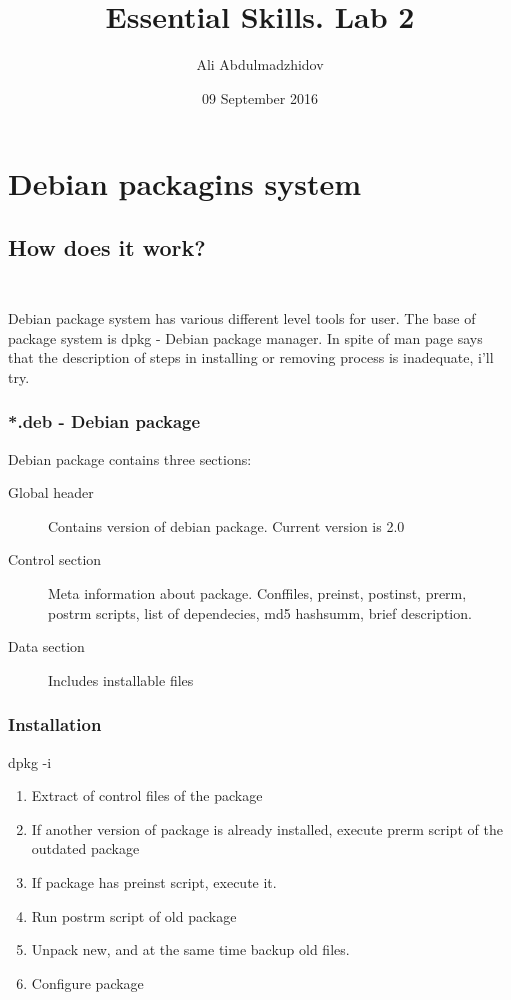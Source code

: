\documentclass[10pt]{article}
\title{Essential Skills. Lab 2}
\date{09 September 2016}
\author{Ali Abdulmadzhidov}
\begin{document}
\renewcommand*\rmdefault{cmss}
  \maketitle
  \section{Debian packagins system    \newline}

  \subsection {How does it work? \\ \\}
        Debian package system has various different level tools for user. The base of package system is dpkg - Debian package manager. In spite of man page says that the description of steps in installing or removing process is inadequate, i'll try.
        
        \subsubsection*{*.deb - Debian package}
            Debian package contains three sections:
                \begin{description}
                    \item[Global header] Contains version of debian package. Current version is 2.0
                    \item[Control section] Meta information about package. Conffiles, preinst, postinst, prerm, postrm scripts, list of dependecies, md5 hashsumm, brief description. 
                    \item[Data section] Includes installable files
                \end{description}
        \subsubsection*{Installation}
        dpkg -i
        \begin{enumerate}[label=\arabic*,ref=\theenumi]
            \item Extract of control files of the package
            \item If another version of package is already installed, execute prerm script of the outdated package
            \item If package has preinst script, execute it.
            \item Run postrm script of old package
            \item Unpack new, and at the same time backup old files.
            \item Configure package
        \end{enumerate}
\end{document}
